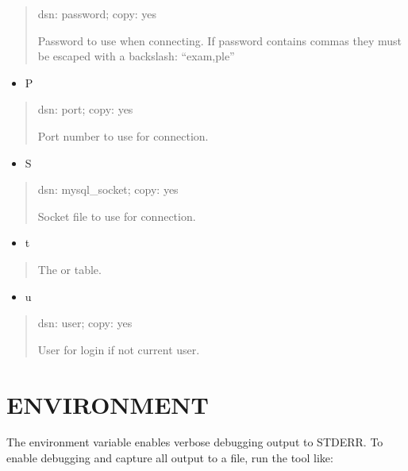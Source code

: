 \documentclass[letterpaper,10pt,english]{sphinxmanual}
\begin{document}
\begin{quote}

dsn: password; copy: yes

Password to use when connecting.
If password contains commas they must be escaped with a backslash: “exam,ple”
\end{quote}
\begin{itemize}
\item {} 
P

\end{itemize}
\begin{quote}

dsn: port; copy: yes

Port number to use for connection.
\end{quote}
\begin{itemize}
\item {} 
S

\end{itemize}
\begin{quote}

dsn: mysql\_socket; copy: yes

Socket file to use for connection.
\end{quote}
\begin{itemize}
\item {} 
t

\end{itemize}
\begin{quote}

The {\hyperref[\detokenize{mariadb-query-digest:cmdoption-mariadb-query-digest-review}]{}} or {\hyperref[\detokenize{mariadb-query-digest:cmdoption-mariadb-query-digest-history}]{}} table.
\end{quote}
\begin{itemize}
\item {} 
u

\end{itemize}
\begin{quote}

dsn: user; copy: yes

User for login if not current user.
\end{quote}


\section{ENVIRONMENT}
\label{\detokenize{mariadb-query-digest:environment}}
The environment variable  enables verbose debugging output to STDERR.
To enable debugging and capture all output to a file, run the tool like:
\end{document}
